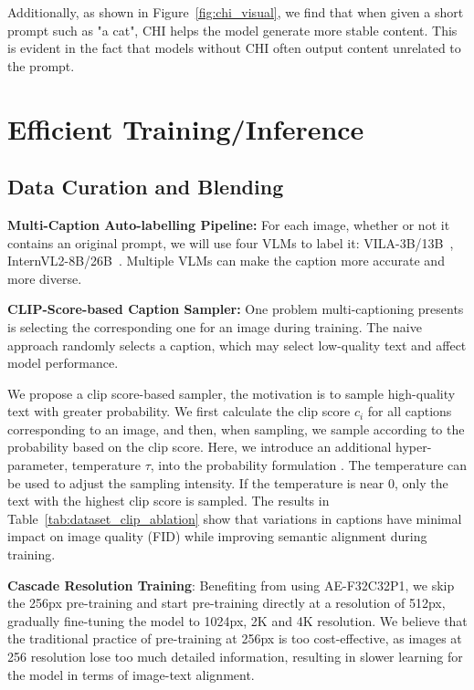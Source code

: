Additionally, as shown in Figure~\ref{fig:chi_visual}, we find that when given a short prompt such as "a cat", CHI helps the model generate more stable content. This is evident in the fact that models without CHI often output content unrelated to the prompt.


\section{Efficient Training/Inference} \label{sec:efficient_train_infer}


\subsection{Data Curation and Blending} \label{data_curation}


\noindent \textbf{Multi-Caption Auto-labelling Pipeline:} 
For each image, whether or not it contains an original prompt, we will use four VLMs to label it: VILA-3B/13B~\citep{lin2024vila}, InternVL2-8B/26B~\citep{chen2024internvl}. Multiple VLMs can make the caption more accurate and more diverse. 

\noindent \textbf{CLIP-Score-based Caption Sampler:}
One problem multi-captioning presents is selecting the corresponding one for an image during training. The naive approach randomly selects a caption, which may select low-quality text and affect model performance.

We propose a clip score-based sampler, the motivation is to sample high-quality text with greater probability. We first calculate the clip score $c_i$ for all captions corresponding to an image, and then, when sampling, we sample according to the probability based on the clip score. Here, we introduce an additional hyper-parameter, temperature $\tau$, into the probability formulation . The temperature can be used to adjust the sampling intensity. If the temperature is near 0, only the text with the highest clip score is sampled. The results in Table~\ref{tab:dataset_clip_ablation} show that variations in captions have minimal impact on image quality (FID) while improving semantic alignment during training.

\noindent \textbf{Cascade Resolution Training}: 
Benefiting from using AE-F32C32P1, we skip the 256px pre-training and start pre-training directly at a resolution of 512px, gradually fine-tuning the model to 1024px, 2K and 4K resolution.
We believe that the traditional practice of pre-training at 256px is too cost-effective, as images at 256 resolution lose too much detailed information, resulting in slower learning for the model in terms of image-text alignment.


